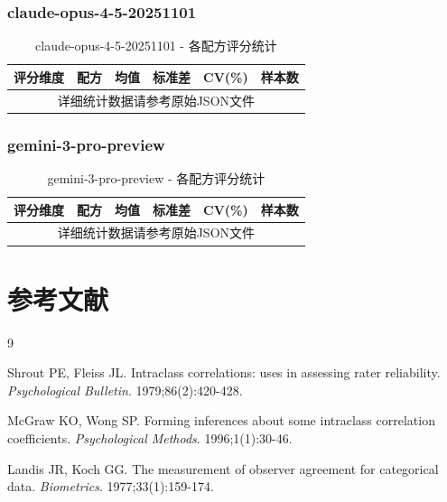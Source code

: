 \documentclass[12pt,a4paper]{article}
\begin{document}
\subsubsection{claude-opus-4-5-20251101}

\begin{table}[H]
\centering
\caption{claude-opus-4-5-20251101 - 各配方评分统计}
\small
\begin{tabular}{llcccc}
\toprule
\textbf{评分维度} & \textbf{配方} & \textbf{均值} & \textbf{标准差} & \textbf{CV(\%)} & \textbf{样本数} \\
\midrule
\multicolumn{6}{c}{详细统计数据请参考原始JSON文件} \\
\bottomrule
\end{tabular}
\end{table}

\subsubsection{gemini-3-pro-preview}

\begin{table}[H]
\centering
\caption{gemini-3-pro-preview - 各配方评分统计}
\small
\begin{tabular}{llcccc}
\toprule
\textbf{评分维度} & \textbf{配方} & \textbf{均值} & \textbf{标准差} & \textbf{CV(\%)} & \textbf{样本数} \\
\midrule
\multicolumn{6}{c}{详细统计数据请参考原始JSON文件} \\
\bottomrule
\end{tabular}
\end{table}


\section{参考文献}

\begin{thebibliography}{9}

Shrout PE, Fleiss JL.
\newblock Intraclass correlations: uses in assessing rater reliability.
\newblock \emph{Psychological Bulletin}. 1979;86(2):420-428.

McGraw KO, Wong SP.
\newblock Forming inferences about some intraclass correlation coefficients.
\newblock \emph{Psychological Methods}. 1996;1(1):30-46.

Landis JR, Koch GG.
\newblock The measurement of observer agreement for categorical data.
\newblock \emph{Biometrics}. 1977;33(1):159-174.

\end{thebibliography}

\newpage
\end{document}
